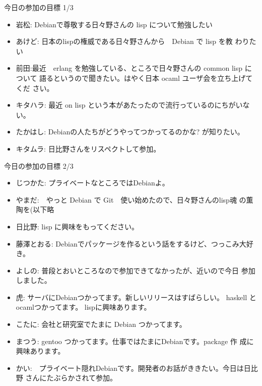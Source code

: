 \frame{\titlepage{}}


\begin{frame}{今日の参加の目標 1/3}

\begin{itemize}
 \item 岩松: Debianで尊敬する日々野さんの lisp について勉強したい
 \item あけど: 日本のlispの権威である日々野さんから　Debian で lisp を教
       わりたい
 \item 前田:最近　erlang を勉強している、ところで日々野さんの common lisp について
       語るというので聞きたい。はやく日本 ocaml ユーザ会を立ち上げてくだ
       さい。
 \item キタハラ: 最近 on lisp という本があたったので流行っているのにちがいな
       い。
 \item たかはし: Debianの人たちがどうやってつかってるのかな? が知りたい。
 \item キタムラ: 日比野さんをリスペクトして参加。
\end{itemize}
\end{frame}

\begin{frame}{今日の参加の目標 2/3}
\begin{itemize}
 \item じつかた: プライベートなところではDebianよ。
 \item やまだ:　やっと Debian で Git　使い始めたので、日々野さんのlisp魂
       の薫陶を(以下略
 \item 日比野: lisp に興味をもってください。
 \item 藤澤とおる: Debianでパッケージを作るという話をするけど、つっこみ大好き。
 \item よしの: 普段とおいところなので参加できてなかったが、近いので今日
       参加しました。
 \item 虎: サーバにDebianつかってます。新しいリリースはすばらしい。
       haskell と ocamlつかってます。 lispに興味あります。
 \item こたに: 会社と研究室でたまに Debian つかってます。
 \item まつう: gentoo つかってます。仕事ではたまにDebianです。package 作
       成に興味あります。
 \item かい:　プライベート隠れDebianです。開発者のお話がききたい。今日は日比野
       さんにたぶらかされて参加。
\end{itemize}
\end{frame}

